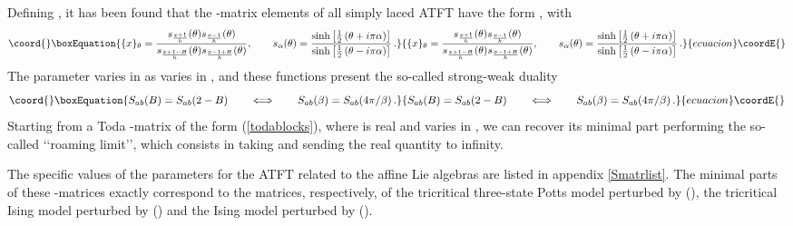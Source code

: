 \documentclass[a4paper,12pt]{report}
\begin{document}
Defining \coordHE{}, it has been found that the \coordHE{}-matrix elements of all simply laced ATFT have the form
\coordHE{}, with
\begin{equation}\coord{}\boxEquation{\label{todablocks}
\{x\}_{\theta}=\frac{s_{\frac{x+1}{h}}(\theta)s_{\frac{x-1}{h}}(\theta)}{s_{\frac{x+1-B}{h}}(\theta)s_{\frac{x-1+B}{h}}(\theta)}
, \qquad s_{\alpha}(\theta)=\frac{\sinh \left[\frac{1}{2}\left(\theta+i\pi \alpha\right)\right]}{\sinh
\left[\frac{1}{2}\left(\theta-i\pi\alpha\right)\right]}\,.
}{\{x\}_{\theta}=\frac{s_{\frac{x+1}{h}}(\theta)s_{\frac{x-1}{h}}(\theta)}{s_{\frac{x+1-B}{h}}(\theta)s_{\frac{x-1+B}{h}}(\theta)}
, \qquad s_{\alpha}(\theta)=\frac{\sinh \left[\frac{1}{2}\left(\theta+i\pi \alpha\right)\right]}{\sinh
\left[\frac{1}{2}\left(\theta-i\pi\alpha\right)\right]}\,.
}{ecuacion}\coordE{}\end{equation}
The parameter \coordHE{} varies in \myHighlight{$[0,2]$}\coordHE{} as \myHighlight{$\beta$}\coordHE{} varies in \myHighlight{$[0,\infty]$}\coordHE{}, and these functions present the so-called
strong-weak duality
\begin{equation}\coord{}\boxEquation{
S_{ab}(B)=S_{ab}(2-B)\qquad\Longleftrightarrow\qquad  S_{ab}(\beta)=S_{ab}(4\pi/\beta)\,.
}{
S_{ab}(B)=S_{ab}(2-B)\qquad\Longleftrightarrow\qquad  S_{ab}(\beta)=S_{ab}(4\pi/\beta)\,.
}{ecuacion}\coordE{}\end{equation}
Starting from a Toda \coordHE{}-matrix of the form (\ref{todablocks}), where \coordHE{} is real and varies in \myHighlight{$[0,2]$}\coordHE{}, we can
recover its minimal part performing the so-called \lq\lq roaming limit\rq\rq, which consists in taking \coordHE{}
and sending the real quantity \coordHE{} to infinity.

\vspace{0.5cm}

The specific values of the parameters \coordHE{} for the ATFT related to the affine Lie algebras \coordHE{} are listed in
appendix \ref{Smatrlist}. The minimal parts of these \coordHE{}-matrices exactly correspond to the \coordHE{} matrices,
respectively, of the tricritical three-state Potts model perturbed by \myHighlight{$\varepsilon$}\coordHE{} (\coordHE{}), the tricritical
Ising model perturbed by \myHighlight{$\varepsilon$}\coordHE{} (\coordHE{}) and the Ising model perturbed by \myHighlight{$\sigma$}\coordHE{} (\coordHE{}).
\end{document}
